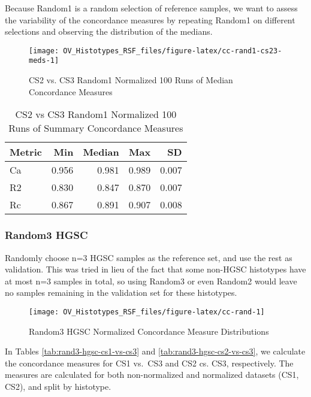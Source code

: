 \documentclass[
]{report}
\begin{document}
Because Random1 is a random selection of reference samples, we want to assess the variability of the concordance measures by repeating Random1 on different selections and observing the distribution of the medians.

\begin{figure}[H]

{\centering \texttt{[image: OV\_Histotypes\_RSF\_files/figure-latex/cc-rand1-cs23-meds-1]} 

}

\caption{CS2 vs. CS3 Random1 Normalized 100 Runs of Median Concordance Measures}\label{fig:cc-rand1-cs23-meds}
\end{figure}

\begin{table}

\caption{\label{tab:metrics-summ-cs23}CS2 vs CS3 Random1 Normalized 100 Runs of Summary Concordance Measures}
\centering
\begin{tabular}[t]{l|r|r|r|r}
\hline
Metric & Min & Median & Max & SD\\
\hline
Ca & 0.956 & 0.981 & 0.989 & 0.007\\
\hline
R2 & 0.830 & 0.847 & 0.870 & 0.007\\
\hline
Rc & 0.867 & 0.891 & 0.907 & 0.008\\
\hline
\end{tabular}
\end{table}

\hypertarget{random3-hgsc}{%
\subsubsection{Random3 HGSC}\label{random3-hgsc}}

Randomly choose n=3 HGSC samples as the reference set, and use the rest as validation. This was tried in lieu of the fact that some non-HGSC histotypes have at most n=3 samples in total, so using Random3 or even Random2 would leave no samples remaining in the validation set for these histotypes.

\begin{figure}[H]

{\centering \texttt{[image: OV\_Histotypes\_RSF\_files/figure-latex/cc-rand-1]} 

}

\caption{Random3 HGSC Normalized Concordance Measure Distributions}\label{fig:cc-rand}
\end{figure}

In Tables \ref{tab:rand3-hgsc-cs1-vs-cs3} and \ref{tab:rand3-hgsc-cs2-vs-cs3}, we calculate the concordance measures for CS1 vs.~CS3 and CS2 cs. CS3, respectively. The measures are calculated for both non-normalized and normalized datasets (CS1, CS2), and split by histotype.
\end{document}
